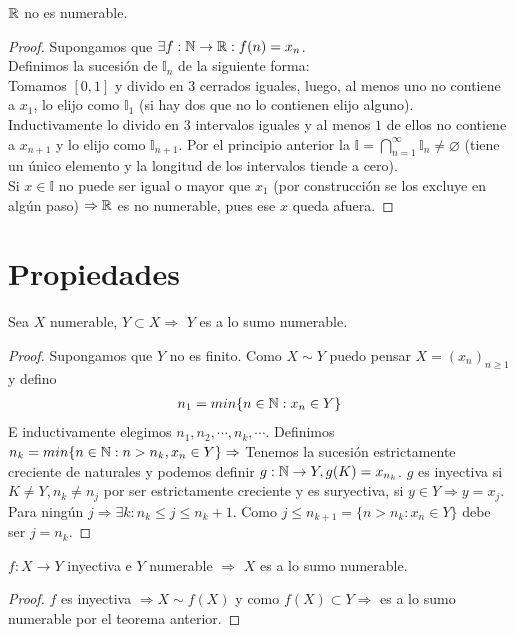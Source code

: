 \begin{theorem}
    $\mathbb{R}$  no es numerable.
    \begin{proof}
        Supongamos que $\exists f:\mathbb{N} \to \mathbb{R} : f(n) = x_n$. \\
        Definimos la sucesión de $\mathbb{I}_n$ de la siguiente forma: \\
        Tomamos $[0, 1]$ y divido en $3$ cerrados iguales, luego, al menos uno no contiene a $x_1$, lo elijo como $\mathbb{I}_1$ (si  hay dos que no lo contienen elijo alguno). Inductivamente lo divido en $3$ intervalos iguales y al menos $1$ de ellos no contiene a $x_{n+1}$ y lo elijo como $\mathbb{I}_{n+1}$. Por el principio anterior la $\mathbb{I} = \bigcap_{n=1}^\infty \mathbb{I}_n \neq \varnothing$ (tiene un único elemento y la longitud de los intervalos tiende a cero). \\
        Si $x \in \mathbb{I}$ no puede ser igual o mayor que $x_1$ (por construcción se los excluye en algún paso) $\Rightarrow \mathbb{R}$ es no numerable, pues ese $x$ queda afuera.
    \end{proof}
\end{theorem}

\section{Propiedades}

\begin{theorem}
    Sea $X$ numerable, $Y \subset X \Rightarrow$ $Y$ es a lo sumo numerable.
    \begin{proof}
        Supongamos que $Y$ no es finito. Como $X \sim Y$ puedo pensar $X = (x_n)_{n\geq1}$ y defino
        \begin{align*}
            n_1=min\{ n \in \mathbb{N}: x_n \in Y \}
        \end{align*}
        E inductivamente elegimos $n_1, n_2, \cdots , n_k, \cdots$. Definimos $n_k = min\{ n \in \mathbb{N} : n > n_k, x_n \in Y \} \Rightarrow$ Tenemos la sucesión estrictamente creciente de naturales y podemos definir $g: \mathbb{N} \to Y, g(K) = x_{n_k}$. $g$ es inyectiva si $K\neq Y, n_k \neq n_j$ por ser estrictamente creciente y es suryectiva, si $y \in Y \Rightarrow y = x_j$. Para ningún $j \Rightarrow \exists k :n_k\leq j \leq n_k+1$. Como $j \leq n_{k+1}=\{ n>n_k:x_n \in Y \}$ debe ser $j = n_k$.
    \end{proof}
\end{theorem}

\begin{corollary}
    $f: X \to Y$ inyectiva e $Y$ numerable $\Rightarrow$ $X$ es a lo sumo numerable.
    \begin{proof}
        $f$ es inyectiva $\Rightarrow X \sim f(X)$ y como $f(X) \subset Y \Rightarrow$ es a lo sumo numerable por el teorema anterior.
    \end{proof}
\end{corollary}

